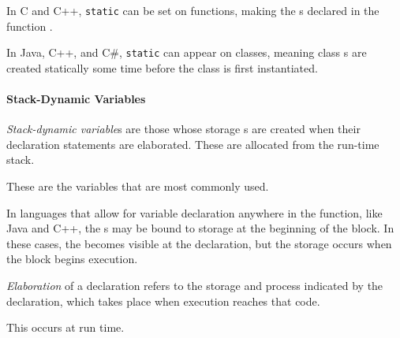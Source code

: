 \begin{remark*}
  In C and C++, \texttt{static} can be set on functions, making the s declared in the function .
\end{remark*}

\begin{remark*}
  In Java, C++, and C\#, \texttt{static} can appear on classes, meaning class s are created statically some time before the class is first instantiated.
\end{remark*}

\paragraph{Stack-Dynamic Variables}\label{par:Stack-Dynamic_Variable_Binding_Lifetime}
\begin{definition}\label{def:Stack-Dynamic_Variable_Binding_Lifetime}
  \emph{Stack-dynamic variable}s are those whose storage s are created when their declaration statements are elaborated.
  These are allocated from the run-time stack.

  \begin{remark}
    These are the variables that are most commonly used.
  \end{remark}

  \begin{remark}
    In languages that allow for variable declaration anywhere in the function, like Java and C++, the s may be bound to storage at the beginning of the block.
    In these cases, the  becomes visible at the declaration, but the storage  occurs when the block begins execution.
  \end{remark}
\end{definition}

\begin{definition}[Elaboration]\label{def:Variable_Storage_Binding_Elaboration}
  \emph{Elaboration} of a  declaration refers to the storage  and  process indicated by the declaration, which takes place when execution reaches that code.

  This occurs at run time.
\end{definition}

